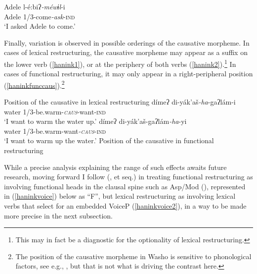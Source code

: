 \documentclass[output=paper]{langscibook}
\begin{document}
\ea
\gll Adele l-é:biʔ{\itshape -méwɨl}-i\\
Adele 1/3-come{\itshape -ask}-{\scshape ind}\\
\glt `I asked Adele to come.' \label{haninkobjectcontrol}
\z 


Finally, variation is observed in possible orderings of the causative morpheme. In cases of lexical restructuring, the causative morpheme may appear as a suffix on the lower verb (\ref{hanink1}), or at the periphery of both verbs (\ref{hanink2}).\footnote{This may in fact be a diagnostic for the optionality of lexical restructuring.} In cases of functional restructuring, it may only appear in a right-peripheral position (\ref{haninkfunccaus}).\footnote{The position of the causative morpheme in Washo is sensitive to phonological factors, see e.g.,  \citealt{jacobsen1973,benz2018}, but that is not what is driving the contrast here.} 

\ea Position of the causative in lexical restructuring
\ea \gll dímeʔ di-yák'aš{\itshape-ha}-gaʔlám-i\\
water 1/3-be.warm-\textit{\textsc{caus}}-want{\scshape-ind}\\
\glt `I want to warm the water up.' \label{hanink1}
\ex \gll dímeʔ di-yák'aš-gaʔlám{\itshape -ha}-yi\\
water 1/3-be.warm-want\textit{\textsc{-caus}}{\scshape-ind}\\
\glt `I want to warm up the water.' \label{hanink2}
\z
\ex Position of the causative in functional restructuring\label{haninkfunccaus}
\z
\z



While a precise analysis explaining the range of such effects awaits future research, moving forward I follow \citeauthor{wurmbrand2001} (\citeyear{wurmbrand2001}, et seq.) in treating functional restructuring as involving functional heads in the clausal spine such as Asp/Mod (\citealt{cinque2001,cinque2004,grano2012diss}), represented in (\ref{haninkvoice}) below as ``F'', but lexical restructuring as involving lexical verbs that select for an embedded VoiceP (\ref{haninkvoice2}), in a way to be made more precise in the next subsection.
\end{document}
